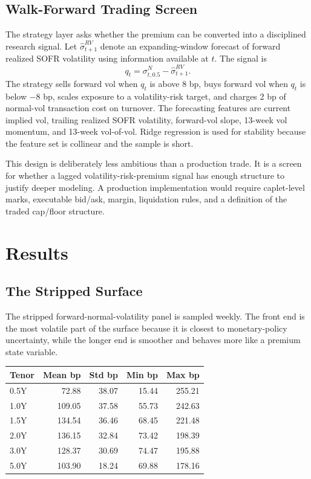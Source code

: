 \documentclass[12pt]{article}
\begin{document}
\subsection{Walk-Forward Trading Screen}

The strategy layer asks whether the premium can be converted into a disciplined research signal.
Let $\widehat{\sigma}^{RV}_{t+1}$ denote an expanding-window forecast of forward realized SOFR
volatility using information available at $t$. The signal is
\begin{equation}
    q_t = \sigma^N_{t,0.5} - \widehat{\sigma}^{RV}_{t+1}.
\end{equation}
The strategy sells forward vol when $q_t$ is above 8 bp, buys forward vol when $q_t$ is below
$-8$ bp, scales exposure to a volatility-risk target, and charges 2 bp of normal-vol transaction cost
on turnover. The forecasting features are current implied vol, trailing realized SOFR volatility,
forward-vol slope, 13-week vol momentum, and 13-week vol-of-vol. Ridge regression is used for
stability because the feature set is collinear and the sample is short.

This design is deliberately less ambitious than a production trade. It is a screen for whether a
lagged volatility-risk-premium signal has enough structure to justify deeper modeling. A production
implementation would require caplet-level marks, executable bid/ask, margin, liquidation rules,
and a definition of the traded cap/floor structure.

\section{Results}

\subsection{The Stripped Surface}

The stripped forward-normal-volatility panel is sampled weekly. The front end is the most
volatile part of the surface because it is closest to monetary-policy uncertainty, while the longer
end is smoother and behaves more like a premium state variable.

\begin{center}
\begin{tabular}{lrrrr}
\toprule
Tenor & Mean bp & Std bp & Min bp & Max bp \\
\midrule
0.5Y & 72.88 & 38.07 & 15.44 & 255.21 \\
1.0Y & 109.05 & 37.58 & 55.73 & 242.63 \\
1.5Y & 134.54 & 36.46 & 68.45 & 221.48 \\
2.0Y & 136.15 & 32.84 & 73.42 & 198.39 \\
3.0Y & 128.37 & 30.69 & 74.47 & 195.88 \\
5.0Y & 103.90 & 18.24 & 69.88 & 178.16 \\
\bottomrule
\end{tabular}
\end{center}
\end{document}
